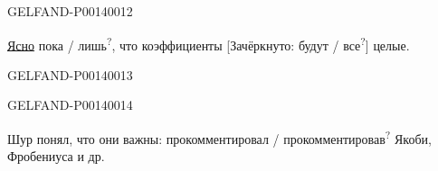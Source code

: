 \begin{GelfandAdjacentEvidence}{GELFAND-P001400}{12}



\uline{Ясно} пока / лишь\textsuperscript{?},
что коэффициенты [Зачёркнуто:
будут / все\textsuperscript{?}] целые.

\end{GelfandAdjacentEvidence}
\begin{GelfandAdjacentEvidence}{GELFAND-P001400}{13}

\end{GelfandAdjacentEvidence}
\begin{GelfandAdjacentEvidence}{GELFAND-P001400}{14}



Шур понял, что они важны:
прокомментировал / прокомментировав\textsuperscript{?} Якоби, Фробениуса и др.

\end{GelfandAdjacentEvidence}



